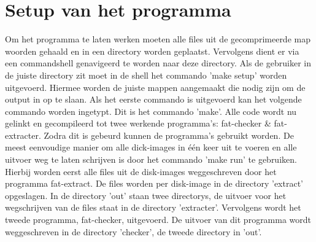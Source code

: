 \documentclass[11pt]{article}
\begin{document}
	\section{Setup van het programma}\label{sec:setup}
	Om het programma te laten werken moeten alle files uit de gecomprimeerde map woorden gehaald en in een directory worden geplaatst. Vervolgens dient er via een commandshell genavigeerd te worden naar deze directory. Als de gebruiker in de juiste directory zit moet in de shell het commando 'make setup' worden uitgevoerd. 
Hiermee worden de juiste mappen aangemaakt die nodig zijn om de output in op te slaan. Als het eerste commando is uitgevoerd kan het volgende commando worden ingetypt. Dit is het commando 'make'. Alle code wordt nu gelinkt en gecompileerd tot twee werkende programma's: fat-checker \& fat-extracter. Zodra dit is gebeurd kunnen de programma's gebruikt worden. De meest eenvoudige manier om alle dick-images in \'e\'en keer uit te voeren en alle uitvoer weg te laten schrijven is door het commando 'make run' te gebruiken. Hierbij worden eerst alle files uit de disk-images weggeschreven door het programma fat-extract. De files worden per disk-image in de directory 'extract' opgeslagen. In de directory 'out' staan twee directorys, de uitvoer voor het wegschrijven van de files staat in de directory 'extracter'.
Vervolgens wordt het tweede programma, fat-checker, uitgevoerd. De uitvoer van dit programma wordt weggeschreven in de directory 'checker', de tweede directory in 'out'.
	
\end{document}
